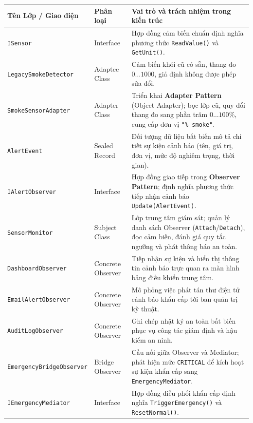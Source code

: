 \documentclass[11pt,a4paper]{article}
\begin{document}
\begin{table}[H]
\centering
\footnotesize
\renewcommand{\arraystretch}{1.12}
\begin{tabular}{>{\raggedright\arraybackslash}p{4.8cm}p{2.5cm}p{7.7cm}}
\toprule
\textbf{Tên Lớp / Giao diện} & \textbf{Phân loại} & \textbf{Vai trò và trách nhiệm trong kiến trúc} \\
\midrule
\texttt{\small ISensor} & Interface & Hợp đồng cảm biến chuẩn định nghĩa phương thức \texttt{ReadValue()} và \texttt{GetUnit()}. \\
\texttt{\small LegacySmokeDetector} & Adaptee Class & Cảm biến khói cũ có sẵn, thang đo $0 \dots 1000$, giả định không được phép sửa đổi. \\
\texttt{\small SmokeSensorAdapter} & Adapter Class & Triển khai \textbf{Adapter Pattern} (Object Adapter); bọc lớp cũ, quy đổi thang đo sang phần trăm $0 \dots 100\%$, cung cấp đơn vị \texttt{"\% smoke"}. \\
\texttt{\small AlertEvent} & Sealed Record & Đối tượng dữ liệu bất biến mô tả chi tiết sự kiện cảnh báo (tên, giá trị, đơn vị, mức độ nghiêm trọng, thời gian). \\
\texttt{\small IAlertObserver} & Interface & Hợp đồng giao tiếp trong \textbf{Observer Pattern}; định nghĩa phương thức tiếp nhận cảnh báo \texttt{Update(AlertEvent)}. \\
\texttt{\small SensorMonitor} & Subject Class & Lớp trung tâm giám sát; quản lý danh sách Observer (\texttt{Attach}/\texttt{Detach}), đọc cảm biến, đánh giá quy tắc ngưỡng và phát thông báo an toàn. \\
\texttt{\small DashboardObserver} & Concrete Observer & Tiếp nhận sự kiện và hiển thị thông tin cảnh báo trực quan ra màn hình bảng điều khiển trung tâm. \\
\texttt{\small EmailAlertObserver} & Concrete Observer & Mô phỏng việc phát tán thư điện tử cảnh báo khẩn cấp tới ban quản trị kỹ thuật. \\
\texttt{\small AuditLogObserver} & Concrete Observer & Ghi chép nhật ký an toàn bất biến phục vụ công tác giám định và hậu kiểm an ninh. \\
\texttt{\small EmergencyBridgeObserver} & Bridge Observer & Cầu nối giữa Observer và Mediator; phát hiện mức \texttt{CRITICAL} để kích hoạt sự kiện khẩn cấp sang \texttt{EmergencyMediator}. \\
\texttt{\small IEmergencyMediator} & Interface & Hợp đồng điều phối khẩn cấp định nghĩa \texttt{TriggerEmergency()} và \texttt{ResetNormal()}. \\

\end{tabular}
\end{table}
\end{document}

